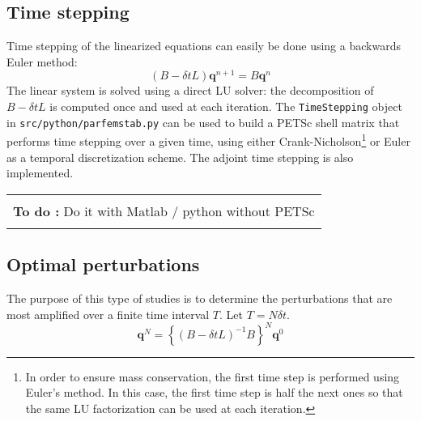 \documentclass[12pts]{article}%
\def\v{\bm}
\def\lcb{\left\{}
\def\rcb{\right\}}
\newenvironment{TODO}{\vspace{.25cm}\begin{center}\begin{tabular}{|p{.75\linewidth}|} \hline\\ \textbf{To do :}}
{ \\ \\\hline \end{tabular}\end{center}\vspace{.25cm}}
\begin{document}
\subsection{Time stepping}

Time stepping of the linearized equations can easily be done using a
backwards Euler method:
\begin{equation*}
  (B - \delta t L) \v{q}^{n+1} = B \v{q}^n
\end{equation*}
The linear system is solved using a direct LU solver: the
decomposition of $B - \delta t L$ is computed once and used at each
iteration. The \texttt{TimeStepping} object in
\texttt{src/python/parfemstab.py} can be used to build a PETSc shell
matrix that performs time stepping over a given time, using either
Crank-Nicholson\footnote{In order to ensure mass conservation, the
  first time step is performed using Euler's method. In this case, the
  first time step is half the next ones so that the same LU factorization
  can be used at each iteration.} or Euler as a temporal discretization scheme. The
adjoint time stepping is also implemented.

\begin{TODO}
Do it with Matlab / python without PETSc
\end{TODO}


\subsection{Optimal perturbations}

The purpose of this type of studies is to determine the perturbations
that are most amplified over a finite time interval $T$. Let $T =
N\delta t$. 
\begin{equation*}
  \v q^N = \lcb (B - \delta t L)^{-1}B\rcb^N \v{q}^0 
\end{equation*}
\end{document}

